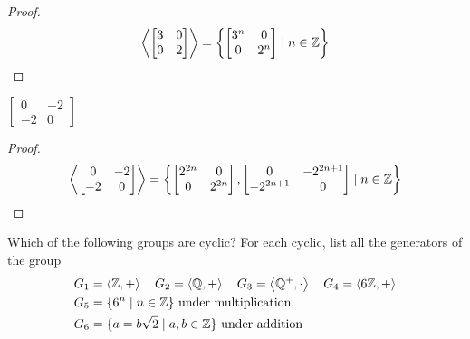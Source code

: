 \begin{proof}
    \[
        \left\langle{\begin{bmatrix}
                3 & 0 \\
                0 & 2
            \end{bmatrix}}\right\rangle = \left\{
        \begin{bmatrix}
            3^{n} & 0     \\
            0     & 2^{n}
        \end{bmatrix} \mid n\in\mathbb{Z}
        \right\}
    \]
\end{proof}

\begin{exercise}
    $\begin{bmatrix}
            0  & -2 \\
            -2 & 0
        \end{bmatrix}$
\end{exercise}

\begin{proof}
    \[
        \left\langle{\begin{bmatrix}
                0  & -2 \\
                -2 & 0
            \end{bmatrix}}\right\rangle = \left\{
        \begin{bmatrix}
            2^{2n} & 0      \\
            0      & 2^{2n}
        \end{bmatrix},
        \begin{bmatrix}
            0         & -2^{2n+1} \\
            -2^{2n+1} & 0
        \end{bmatrix} \mid n\in\mathbb{Z}
        \right\}
    \]
\end{proof}

\begin{exercise}
    Which of the following groups are cyclic? For each cyclic, list all the generators of the group
    \begin{align*}
         & G_{1} = \anglebracket{\mathbb{Z}, +} \quad G_{2} = \anglebracket{\mathbb{Q}, +} \quad G_{3} = \anglebracket{\mathbb{Q}^{+}, \cdot} \quad G_{4} = \anglebracket{6\mathbb{Z}, +} \\
         & G_{5} = \{ 6^{n} \mid n\in\mathbb{Z} \}\ \text{under multiplication}                                                                                                           \\
         & G_{6} = \{ a = b\sqrt{2} \mid a, b\in\mathbb{Z} \}\ \text{under addition}
    \end{align*}
\end{exercise}

